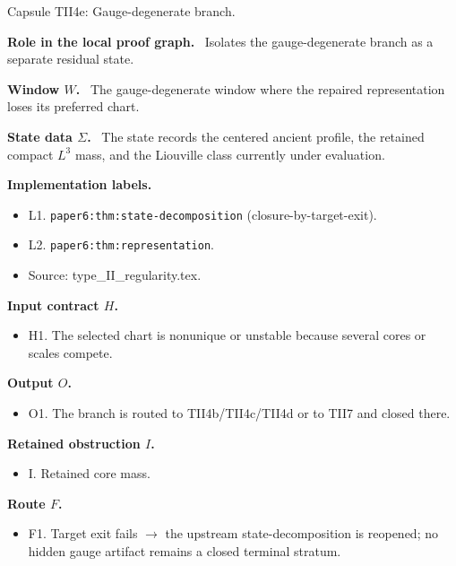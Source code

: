 \documentclass[11pt]{amsart}
\newcommand{\capsulefield}[1]{\par\smallskip\noindent\textbf{#1.}\ }
\begin{document}
\begin{proofcapsule}{Capsule TII4e: Gauge-degenerate branch.}
  \capsulefield{Role in the local proof graph}
  Isolates the gauge-degenerate branch as a separate residual state.

  \capsulefield{Window \(W\)}
The gauge-degenerate window where the repaired representation loses its preferred chart.

  \capsulefield{State data \(\Sigma\)}
The state records the centered ancient profile, the retained compact $L^3$ mass, and the Liouville class currently under evaluation.

  \capsulefield{Implementation labels}
  \begin{itemize}[leftmargin=1.8em]
  \item L1. \texttt{paper6:thm:state-decomposition} (closure-by-target-exit).
  \item L2. \texttt{paper6:thm:representation}.
  \item Source: type\_II\_regularity.tex.
  \end{itemize}

  \capsulefield{Input contract \(H\)}
  \begin{itemize}[leftmargin=1.8em]
  \item H1. The selected chart is nonunique or unstable because several cores or scales compete.
  \end{itemize}

  \capsulefield{Output \(O\)}
  \begin{itemize}[leftmargin=1.8em]
  \item O1. The branch is routed to TII4b/TII4c/TII4d or to TII7 and closed there.
  \end{itemize}

  \capsulefield{Retained obstruction \(I\)}
  \begin{itemize}[leftmargin=1.8em]
  \item I. Retained core mass.
  \end{itemize}

  \capsulefield{Route \(F\)}
  \begin{itemize}[leftmargin=1.8em]
  \item F1. Target exit fails $\to$ the upstream state-decomposition is reopened; no hidden gauge artifact remains a closed terminal stratum.
  \end{itemize}


\end{proofcapsule}
\end{document}
